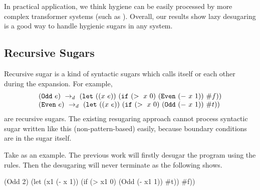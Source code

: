 
In practical application, we think hygiene can be easily processed by more complex transformer systems (such as \cite{10.5555/1792878.1792884}). Overall, our results show lazy desugaring is a good way to handle hygienic sugars in any system.

\subsection{Recursive Sugars}
\label{sec:recursiveSugar}

Recursive sugar is a kind of syntactic sugars which calls itself or each other during the expansion. For example,
\[
\begin{array}{l}
(\mbox{\tt Odd}~e) ~\rightarrow_d~ (\mbox{\tt let}~((x~e))~(\mbox{\tt if}~(>~x~0)~(\mbox{\tt Even}~(-~x~1))~\#f))\\
(\mbox{\tt Even}~e) ~\rightarrow_d~ (\mbox{\tt let}~((x~e))~(\mbox{\tt if}~(>~x~0)~(\mbox{\tt Odd}~(-~x~1))~\#t))
\end{array}
\]
are recursive sugars. The existing resugaring approach cannot process syntactic sugar written like this (non-pattern-based) easily, because boundary conditions are in the sugar itself.

Take  as an example. The previous work will firstly desugar the program using the rules. Then the desugaring will never terminate as the following shows.
\begin{footnotesize}
\begin{Codes}
   (Odd 2)
\qquad\quad(let (x1 (- x 1)) (if (> x1 0) (Odd (- x1 1)) \#t))
\qquad\quad\#f))
\end{Codes}
\end{footnotesize}



